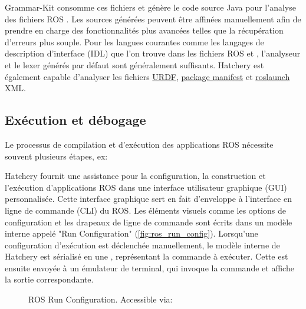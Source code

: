 {Grammar-Kit consomme ces fichiers et génère le code source Java pour l'analyse des fichiers ROS \href{https://wiki.ros.org/msg}{}. Les sources générées peuvent être affinées manuellement afin de prendre en charge des fonctionnalités plus avancées telles que la récupération d'erreurs plus souple. Pour les langues courantes comme les langages de description d'interface (IDL) que l'on trouve dans les fichiers ROS \href{https://wiki.ros.org/msg}{} et \href{https://wiki.ros.org/srv}{}, l'analyseur et le lexer générés par défaut sont généralement suffisants. Hatchery est également capable d'analyser les fichiers \href{https://wiki.ros.org/urdf}{URDF}, \href{https://wiki.ros.org/Manifest}{package manifest} et \href{https://wiki.ros.org/roslaunch/XML}{roslaunch} XML.

\subsection{Exécution et débogage}

Le processus de compilation et d'exécution des applications ROS nécessite souvent plusieurs étapes, ex:
%
%
Hatchery fournit une assistance pour la configuration, la construction et l'exécution d'applications ROS dans une interface utilisateur graphique (GUI) personnalisée. Cette interface graphique sert en fait d'enveloppe à l'interface en ligne de commande (CLI) du ROS. Les éléments visuels comme les options de configuration et les drapeaux de ligne de commande sont écrits dans un modèle interne appelé "Run Configuration" (\autoref{fig:ros_run_config}). Lorsqu'une configuration d'exécution est déclenchée manuellement, le modèle interne de Hatchery est sérialisé en une , représentant la commande à exécuter. Cette  est ensuite envoyée à un émulateur de terminal, qui invoque la commande et affiche la sortie correspondante.

\begin{figure}
\centering
{}
\caption{ROS Run Configuration. Accessible via: }
\label{fig:ros_run_config}
\end{figure}

}
